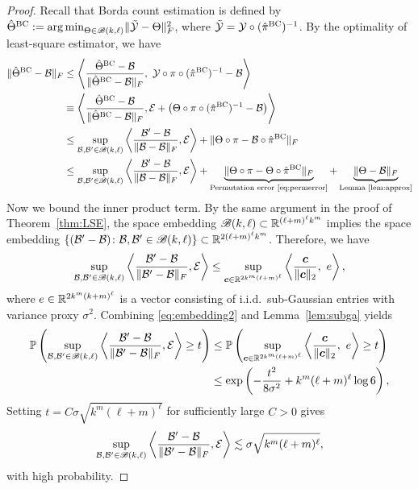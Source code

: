 \documentclass[11pt]{article}
\theoremstyle{definition}
\def\caliB{\mathscr{B}}
\begin{document}
\begin{proof}
    Recall that Borda count estimation is defined by $\hat\Theta^{\textup{BC}} := \argmin_{\Theta\in\caliB(k,\ell)}\FnormSize{}{\tilde\tY-\Theta}^2$, where $\tilde{\mathcal{Y}} = \mathcal{Y}\circ(\hat\pi^{\textup{BC}})^{-1}$.
     By the optimality of least-square estimator, we have
\begin{align}
\FnormSize{}{\hat\Theta^\textup{BC} -\tB}&\leq \left\langle {\hat \Theta^\textup{BC}-\tB \over \FnormSize{}{ \hat \Theta^\textup{BC}-\tB}},\ \tY\circ\pi\circ(\hat\pi^{\textup{BC}})^{-1}-\tB \right \rangle\\ &\equiv \left\langle {\hat \Theta^\textup{BC}-\tB \over \FnormSize{}{ \hat \Theta^\textup{BC}-\tB}},\tE+
\left(\Theta\circ\pi\circ(\hat\pi^{\textup{BC}})^{-1}-\tB\right) \right \rangle \\
&\leq \sup_{\tB, \tB'\in \caliB(k,\ell)} \left\langle {\tB'-\tB \over \FnormSize{}{\tB-\tB}}, \tE \right \rangle+\FnormSize{}{\Theta\circ \pi-\tB\circ \hat\pi^{\textup{BC}}}\\&\leq \sup_{\tB, \tB'\in \caliB(k,\ell)} \left\langle {\tB'-\tB \over \FnormSize{}{\tB-\tB}}, \tE \right \rangle+\underbrace{\FnormSize{}{\Theta\circ \pi-\Theta\circ \hat\pi^{\textup{BC}}}}_{\textup{Permutation error \eqref{eq:permerror}}}+\underbrace{\FnormSize{}{\Theta-\tB}}_{\textup{Lemma~\ref{lem:approx}}}
\end{align}
Now we bound the inner product term. 
 By the same argument in the proof of Theorem~\ref{thm:LSE}, the space embedding $\caliB(k,\ell)\subset \bbR^{(\ell+m)^\ell k^m}$ implies the space embedding $\{(\tB'-\tB)\colon \tB, \tB'\in\caliB(k,\ell)\} \subset\bbR^{2(\ell+m)^\ell k^m}$.
Therefore, we have 
\begin{align}\label{eq:embedding2}
\sup_{\tB, \tB'\in \caliB(k,\ell)} \left\langle {\tB'-\tB \over \FnormSize{}{\tB'-\tB}}, \tE \right \rangle \leq \sup_{\mc\in \bbR^{2k^m(\ell+m)^\ell } }\left\langle {\mc\over \vnormSize{}{\mc}},\ e \right\rangle,
\end{align}
where  $e\in\mathbb{R}^{2k^m(k+m)^\ell}$ is a vector consisting of i.i.d.\ sub-Gaussian entries with variance proxy $\sigma^2$. 
Combining \eqref{eq:embedding2} and Lemma~\ref{lem:subga} yields 
\begin{align}
    \mathbb{P}\left(\sup_{\tB, \tB'\in \caliB(k,\ell)} \left\langle {\tB'-\tB \over \FnormSize{}{\tB'-\tB}}, \tE \right \rangle\geq t\right)
    &\leq \mathbb{P}\left( \sup_{\mc\in \bbR^{2k^m(\ell+m)^\ell } }\left\langle {\mc\over \vnormSize{}{\mc}},\ e \right\rangle\geq t\right)\\&\leq \exp\left(-\frac{t^2}{8\sigma^2} +k^m(\ell+m)^\ell\log 6 \right),
\end{align}
Setting $t = C\sigma\sqrt{k^m(\ell+m)^\ell}$ for sufficiently large $C>0$ gives
\begin{align}\label{eq:nonparae}
    \sup_{\tB, \tB'\in \caliB(k,\ell)} \left\langle {\tB'-\tB \over \FnormSize{}{\tB'-\tB}}, \tE \right \rangle\lesssim \sigma\sqrt{k^m(\ell+m)^\ell},
\end{align}
with high probability.


\end{proof}
\end{document}
